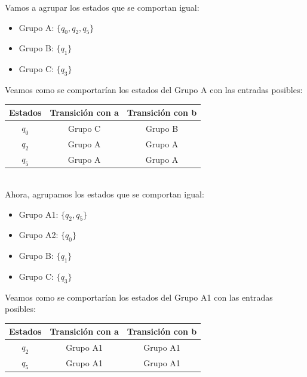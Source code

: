 \begin{enumerate}
 Vamos a agrupar los estados que se comportan igual:\\
 \begin{itemize}
    \item Grupo A: $\{q_0, q_2, q_5\}$
    \item Grupo B: $\{q_1\}$
    \item Grupo C: $\{q_3\}$
 \end{itemize}
    Veamos como se comportarían los estados del Grupo A con las entradas posibles:  \\    
    \begin{table}[h!]
    \centering      
    \begin{tabular}{|c|c|c|}
    \hline
    \textbf{Estados} & \textbf{Transición con a} & \textbf{Transición con b } \\
    \hline
    $q_0$ & Grupo C & Grupo B\\     
    \hline
    $q_2$  & Grupo A & Grupo A \\       
    \hline
    $q_5$ & Grupo A & Grupo A \\    
    \hline
    \end{tabular}       
    \label{tab:ejemplo}
    \end{table}\\
    Ahora, agrupamos los estados que se comportan igual:\\
    \begin{itemize}     
        \item Grupo A1: $\{q_2, q_5\}$
        \item Grupo A2: $\{q_0\}$
        \item Grupo B: $\{q_1\}$
        \item Grupo C: $\{q_3\}$
    \end{itemize}
    Veamos como se comportarían los estados del Grupo A1 con las entradas posibles:   \\   
    \begin{table}[h!]        
    \centering      
    \begin{tabular}{|c|c|c|}        
    \hline
    \textbf{Estados} & \textbf{Transición con a} & \textbf{Transición con b } \\
    \hline
    $q_2$  & Grupo A1 & Grupo A1 \\ 
    \hline
    $q_5$ & Grupo A1 & Grupo A1 \\  
    \hline
    \end{tabular}       
    \label{tab:ejemplo} 
    \end{table}\\

\end{enumerate}
